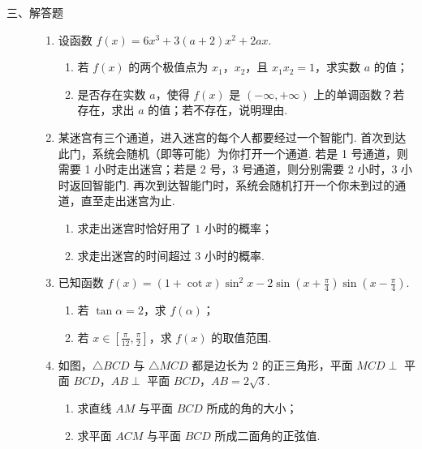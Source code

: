 \begin{description}

    \item[三、解答题]

    \begin{enumerate}[leftmargin=5pt]

      \addtocounter{enumi}{+16}

        \item 设函数 \(f(x) = 6x^{3} + 3(a + 2)x^{2} + 2ax\).
\begin{enumerate}
\item 若 \(f(x)\) 的两个极值点为 \(x_{1}\)，\(x_{2}\)，且 \(x_{1}x_{2} = 1\)，求实数 \(a\) 的值；
\item 是否存在实数 \(a\)，使得 \(f(x)\) 是 \((-\infty, +\infty)\) 上的单调函数？若存在，求出 \(a\) 的值；若不存在，说明理由.
\end{enumerate}

        \item 某迷宫有三个通道，进入迷宫的每个人都要经过一个智能门. 首次到达此门，系统会随机（即等可能）为你打开一个通道. 若是 1 号通道，则需要 1 小时走出迷宫；若是 2 号，3 号通道，则分别需要 2 小时，3 小时返回智能门. 再次到达智能门时，系统会随机打开一个你未到过的通道，直至走出迷宫为止.
\begin{enumerate}
\item 求走出迷宫时恰好用了 \(1\) 小时的概率；
\item 求走出迷宫的时间超过 \(3\) 小时的概率.
\end{enumerate}

        \item 已知函数 \(f(x) = (1 + \cot x)\sin^{2}x - 2\sin \left(x + \frac{\pi}{4}\right)\sin \left(x - \frac{\pi}{4}\right)\).
\begin{enumerate}
\item 若 \(\tan \alpha = 2\)，求 \(f(\alpha)\)；
\item 若 \(x \in \left[\frac{\pi}{12}, \frac{\pi}{2}\right]\)，求 \(f(x)\) 的取值范围.
\end{enumerate}

        \item 如图，\(\triangle BCD\) 与 \(\triangle MCD\) 都是边长为 \(2\) 的正三角形，平面 \(MCD \perp\) 平面 \(BCD\)，\(AB \perp\) 平面 \(BCD\)，\(AB = 2\sqrt{3}\).
\begin{enumerate}
\item 求直线 \(AM\) 与平面 \(BCD\) 所成的角的大小；
\item 求平面 \(ACM\) 与平面 \(BCD\) 所成二面角的正弦值.
\end{enumerate}


\end{enumerate}
\end{description}
